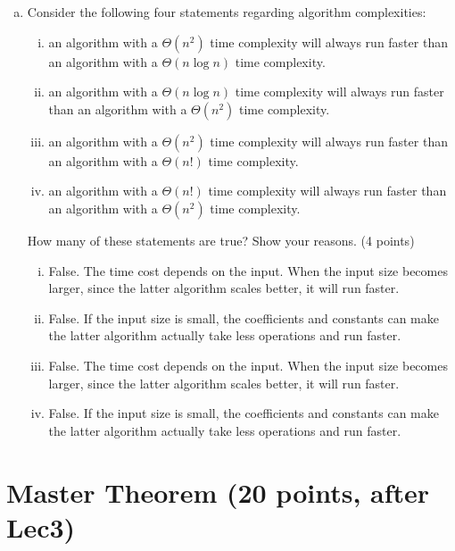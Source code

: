 \documentclass[11pt]{exam}
\begin{document}
\begin{enumerate}[(a)]
\item Consider the following four statements regarding algorithm complexities:
\begin{enumerate}[i)]
\item an algorithm with a $\Theta(n^2)$ time complexity will always run faster than an algorithm with a $\Theta(n \log n)$ time complexity.
\item an algorithm with a $\Theta(n \log n)$ time complexity will always run faster than an algorithm with a $\Theta(n^2)$ time complexity.
\item an algorithm with a $\Theta(n^2)$ time complexity will always run faster than an algorithm with a $\Theta(n!)$ time complexity.
\item an algorithm with a $\Theta(n!)$ time complexity will always run faster than an algorithm with a $\Theta(n^2)$ time complexity.
\end{enumerate}

How many of these statements are true? Show your reasons. (4 points)
\begin{solution}
\begin{enumerate}[i)]
    \item False. The time cost depends on the input. When the input size becomes larger, since the latter algorithm scales better, it will run faster.
    \item False. If the input size is small, the coefficients and constants can make the latter algorithm actually take less operations and run faster.
    \item False. The time cost depends on the input. When the input size becomes larger, since the latter algorithm scales better, it will run faster.
    \item False. If the input size is small, the coefficients and constants can make the latter algorithm actually take less operations and run faster.
    \end{enumerate}
\end{solution}

\end{enumerate}
\newpage
\section{Master Theorem (20 points, after Lec3)}
\end{document}
